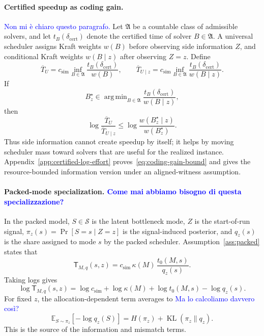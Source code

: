 \documentclass{article}
\DeclareMathOperator*{\argmin}{arg\,min}
\DeclareMathOperator{\KL}{KL}
\newcommand{\cS}{\mathcal{S}}
\newcommand{\E}{\mathbb{E}}
\begin{document}
\paragraph{Certified speedup as coding gain.}
\textcolor{blue}{Non mi è chiaro questo paragrafo.}
Let \(\mathfrak A\) be a countable class of admissible solvers, and let
\(t_B(\delta_{\mathrm{cert}})\) denote the certified time of solver \(B\in\mathfrak A\).
A universal scheduler assigns Kraft weights \(w(B)\) before observing side information
\(Z\), and conditional Kraft weights \(w(B\mid z)\) after observing \(Z=z\).  Define
\[
    \overline T_U
    =
    c_{\mathrm{sim}}
    \inf_{B\in\mathfrak A}
    \frac{t_B(\delta_{\mathrm{cert}})}{w(B)},
    \qquad
    \overline T_{U\mid z}
    =
    c_{\mathrm{sim}}
    \inf_{B\in\mathfrak A}
    \frac{t_B(\delta_{\mathrm{cert}})}{w(B\mid z)} .
\]
If
\[
    B_z^\star
    \in
    \argmin_{B\in\mathfrak A}
    \frac{t_B(\delta_{\mathrm{cert}})}{w(B\mid z)},
\]
then
\begin{equation}
\label{eq:coding-gain-bound}
    \log\frac{\overline T_U}{\overline T_{U\mid z}}
    \le
    \log\frac{w(B_z^\star\mid z)}{w(B_z^\star)} .
\end{equation}
Thus side information cannot create speedup by itself; it helps by moving scheduler mass
toward solvers that are useful for the realized instance.  Appendix~\ref{app:certified-log-effort}
proves~\eqref{eq:coding-gain-bound} and gives the resource-bounded information version
under an aligned-witness assumption.

\paragraph{Packed-mode specialization. \textcolor{blue}{Come mai abbiamo bisogno di questa specializzazione?}}
In the packed model, \(S\in\cS\) is the latent bottleneck mode, \(Z\) is the start-of-run
signal, \(\pi_z(s)=\Pr[S=s\mid Z=z]\) is the signal-induced posterior, and \(q_z(s)\)
is the share assigned to mode \(s\) by the packed scheduler.  Assumption~\ref{ass:packed}
states that
\[
    \mathsf T_{M,q}(s,z)
    =
    c_{\mathrm{sim}}\,
    \kappa(M)\,
    \frac{t_0(M,s)}{q_z(s)} .
\]
Taking logs gives
\[
    \log \mathsf T_{M,q}(s,z)
    =
    \log c_{\mathrm{sim}}
    +
    \log\kappa(M)
    +
    \log t_0(M,s)
    -
    \log q_z(s).
\]
For fixed \(z\), the allocation-dependent term averages to \textcolor{blue}{Ma lo calcoliamo davvero così?}
\[
    \E_{S\sim\pi_z}[-\log q_z(S)]
    =
    H(\pi_z)+\KL(\pi_z\|q_z).
\]
This is the source of the information and mismatch terms.
\end{document}

